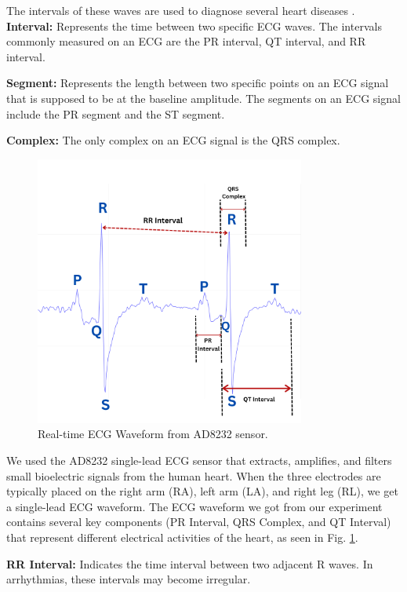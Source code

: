 \documentclass[conference]{IEEEtran}
\begin{document}
The intervals of these waves are used to diagnose several heart diseases \cite{shaown2019iot}.\\

\textbf{Interval:} Represents the time between two specific ECG waves. The intervals commonly measured on an ECG are the PR interval, QT interval, and RR interval.

\textbf{Segment:} Represents the length between two specific points on an ECG signal that is supposed to be at the baseline amplitude. The segments on an ECG signal include the PR segment and the ST segment.

\textbf{Complex:} The only complex on an ECG signal is the QRS complex.

\begin{figure}[htbp]
\centerline{\includegraphics[width=3.5in]{13-Real-time ECG Waveform AD8232.png}}
\caption{Real-time ECG Waveform from AD8232 sensor.}
\label{fig-13:Real-Time-ECG}
\end{figure}

We used the AD8232 single-lead ECG sensor that extracts, amplifies, and filters small bioelectric signals from the human heart. When the three electrodes are typically placed on the right arm (RA), left arm (LA), and right leg (RL), we get a single-lead ECG waveform. The ECG waveform we got from our experiment contains several key components (PR Interval, QRS Complex, and QT Interval) that represent different electrical activities of the heart, as seen in Fig. \ref{fig-13:Real-Time-ECG}.

\textbf{RR Interval:} Indicates the time interval between two adjacent R waves. In arrhythmias, these intervals may become irregular.
\end{document}
